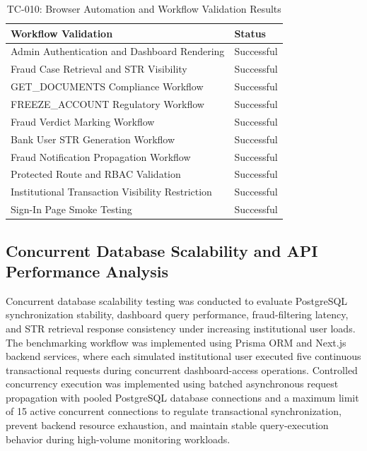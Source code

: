 \begin{table}[H]
\centering
\caption{TC-010: Browser Automation and Workflow Validation Results}
\label{tab:browser_automation_test}
\vspace{0.2cm}

\begin{tabular}{|p{7cm}|p{4cm}|}
\hline
\textbf{Workflow Validation} & \textbf{Status} \\ \hline
Admin Authentication and Dashboard Rendering & Successful \\ \hline
Fraud Case Retrieval and STR Visibility & Successful \\ \hline
GET\_DOCUMENTS Compliance Workflow & Successful \\ \hline
FREEZE\_ACCOUNT Regulatory Workflow & Successful \\ \hline
Fraud Verdict Marking Workflow & Successful \\ \hline
Bank User STR Generation Workflow & Successful \\ \hline
Fraud Notification Propagation Workflow & Successful \\ \hline
Protected Route and RBAC Validation & Successful \\ \hline
Institutional Transaction Visibility Restriction & Successful \\ \hline
Sign-In Page Smoke Testing & Successful \\ \hline
\end{tabular}
\end{table}

\renewcommand{\arraystretch}{1}

\subsection[Concurrent Database Scalability and API Performance Analysis]{\textbf{Concurrent Database Scalability and API Performance Analysis}}

Concurrent database scalability testing was conducted to evaluate PostgreSQL synchronization stability, dashboard query performance, fraud-filtering latency, and STR retrieval response consistency under increasing institutional user loads. The benchmarking workflow was implemented using Prisma ORM and Next.js backend services, where each simulated institutional user executed five continuous transactional requests during concurrent dashboard-access operations. Controlled concurrency execution was implemented using batched asynchronous request propagation with pooled PostgreSQL database connections and a maximum limit of 15 active concurrent connections to regulate transactional synchronization, prevent backend resource exhaustion, and maintain stable query-execution behavior during high-volume monitoring workloads.


